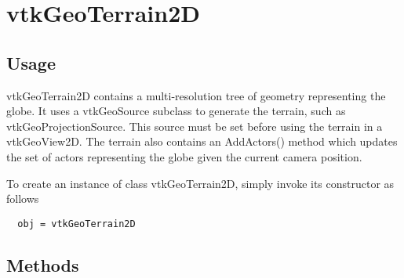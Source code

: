 \section{vtkGeoTerrain2D}

\subsection{Usage}

 vtkGeoTerrain2D contains a multi-resolution tree of geometry representing
 the globe. It uses a vtkGeoSource subclass to generate the terrain, such
 as vtkGeoProjectionSource. This source must be set before using the
 terrain in a vtkGeoView2D. The terrain also contains an AddActors()
 method which updates the set of actors representing the globe given the
 current camera position.

To create an instance of class vtkGeoTerrain2D, simply
invoke its constructor as follows
\begin{verbatim}
  obj = vtkGeoTerrain2D
\end{verbatim}
\subsection{Methods}

